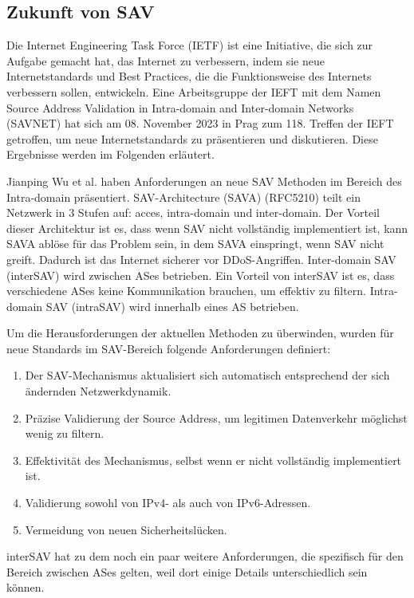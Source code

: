 \documentclass[sigplan,screen]{acmart}
\begin{document}
\subsection{Zukunft von SAV}
Die Internet Engineering Task Force (IETF) ist eine Initiative, die sich zur Aufgabe gemacht hat, das Internet zu verbessern, indem sie neue Internetstandards und Best Practices, die die Funktionsweise des Internets verbessern sollen, entwickeln.
Eine Arbeitsgruppe der IEFT mit dem Namen Source Address Validation in Intra-domain and Inter-domain Networks (SAVNET) hat sich am 08. November 2023 in Prag zum 118. Treffen der IEFT getroffen, um neue Internetstandards zu präsentieren und diskutieren. Diese Ergebnisse werden im Folgenden erläutert. 

Jianping Wu et al. \cite{SAV_requirements01} haben Anforderungen an neue SAV Methoden im Bereich des Intra-domain präsentiert. SAV-Architecture (SAVA) (RFC5210) teilt ein Netzwerk in 3 Stufen auf: acces, intra-domain und inter-domain. Der Vorteil dieser Architektur ist es, dass wenn SAV nicht vollständig implementiert ist, kann SAVA ablöse für das Problem sein, in dem SAVA einspringt, wenn SAV nicht greift. Dadurch ist das Internet sicherer vor DDoS-Angriffen. Inter-domain SAV (interSAV) wird zwischen ASes betrieben. Ein Vorteil von interSAV ist es, dass verschiedene ASes keine Kommunikation brauchen, um effektiv zu filtern. Intra-domain SAV (intraSAV) wird innerhalb eines AS betrieben.

Um die Herausforderungen der aktuellen Methoden zu überwinden, wurden für neue Standards im SAV-Bereich folgende Anforderungen definiert:

\begin{enumerate}
\item Der SAV-Mechanismus aktualisiert sich automatisch entsprechend der sich ändernden Netzwerkdynamik.
\item Präzise Validierung der Source Address, um legitimen Datenverkehr möglichst wenig zu filtern.
\item Effektivität des Mechanismus, selbst wenn er nicht vollständig implementiert ist.
\item Validierung sowohl von IPv4- als auch von IPv6-Adressen.
\item Vermeidung von neuen Sicherheitslücken.
\end{enumerate}

interSAV hat zu dem noch ein paar weitere Anforderungen, die spezifisch für den Bereich zwischen ASes gelten, weil dort einige Details unterschiedlich sein können.
\end{document}
